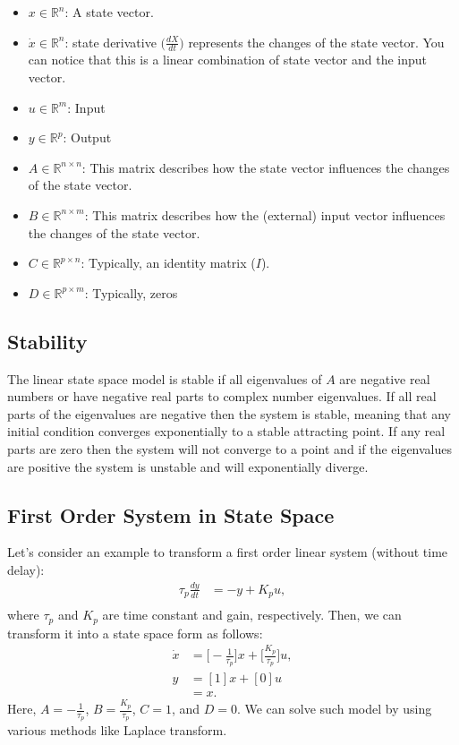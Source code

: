 \begin{itemize}
	\item $x\in \mathbb{R}^n$: A state vector.
	\item $\dot{x}\in \mathbb{R}^n$: state derivative \ie $\big(\frac{dX}{dt}\big)$ represents the changes of the state vector. You can notice that this is a linear combination of state vector and the input vector. 
	\item $u\in \mathbb{R}^m$: Input
	\item $y\in \mathbb{R}^p$: Output
	\item $A\in \mathbb{R}^{n\times n}$: This matrix describes how the state vector influences the changes of the state vector. 
	\item $B\in \mathbb{R}^{n\times m}$: This matrix describes how the (external) input vector influences the changes of the state vector. 
	\item $C\in \mathbb{R}^{p\times n}$: Typically, an identity matrix ($I$).
	\item $D\in \mathbb{R}^{p\times m}$: Typically, zeros
\end{itemize}


\subsection{Stability}

The linear state space model is stable if all eigenvalues of $A$ are negative real numbers or have negative real parts to complex number eigenvalues. If all real parts of the eigenvalues are negative then the system is stable, meaning that any initial condition converges exponentially to a stable attracting point. If any real parts are zero then the system will not converge to a point and if the eigenvalues are positive the system is unstable and will exponentially diverge.

\subsection{First Order System in State Space}

Let's consider an example to transform a first order linear system (without time delay):
\begin{align*}
	\tau_{p}\frac{dy}{dt} &= -y+K_pu,\\
\end{align*}
where $\tau_{p}$ and $K_p$ are time constant and gain, respectively. Then, we can transform it into a state space form as follows:
\begin{align*}
	\dot{x}&= \bigg[-\frac{1}{\tau_p}\bigg]x+\bigg[\frac{K_p}{\tau_p}\bigg]u,\\
	y &= [1]x+[0]u\\
	  &= x.
\end{align*}
Here, $A=-\frac{1}{\tau_p}$, $B = \frac{K_p}{\tau_p}$, $C=1$, and $D=0$. We can solve such model by using various methods like Laplace transform. 


